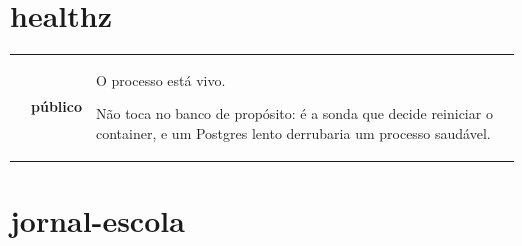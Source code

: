 \section{healthz}

\begin{tabularx}{\linewidth}{@{}L{40mm}L{24mm}X@{}}
\toprule
\headrow {} &  & \\
\midrule
\endhead
{} & \textbf{público} & O processo está vivo.\par Não toca no banco de propósito: é a sonda que decide reiniciar o container, e um Postgres lento derrubaria um processo saudável.\\
\bottomrule
\end{tabularx}

\section{jornal-escola}

